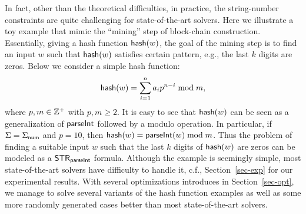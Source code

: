 In fact, other than the theoretical difficulties, in practice, the string-number constraints are quite challenging for state-of-the-art solvers. 
Here we illustrate a toy example that mimic the ``mining'' step of block-chain construction. 
Essentially, giving a hash function ${\sf hash}(w)$, the goal of the mining step is to find an input $w$ such that ${\sf hash}(w)$ satisfies certain pattern, e.g., the last $k$ digits are zeros. 
Below we consider a simple hash function:
$${\sf hash}(w) = \sum \limits_{i = 1}^n a_i p^{n-i} \bmod m,$$ 
where $p, m \in \mathbb{Z}^+$ with $p, m \ge 2$. 
It is easy to see that ${\sf hash}(w)$ can be seen as a generalization of $\textsf{parseInt}$ followed by a modulo operation. 
In particular, if $\Sigma = \Sigma_{\sf num}$ and $p = 10$, then ${\sf hash}(w) = \textsf{parseInt}(w) \bmod m$. Thus the problem of finding a suitable input $w$ such that the last $k$ digits of ${\sf hash}(w)$ are zeros can be modeled as a ${\sf STR}_{\textsf{parseInt}}$ formula. Although the example is seemingly simple, most state-of-the-art solvers have difficulty to handle it, c.f., Section~\ref{sec-exp} for our experimental results. 
With several optimizations introduces in Section~\ref{sec-opt}, we manage to solve several variants of the hash function examples as well as some more randomly generated cases better than most state-of-the-art solvers. 
 



